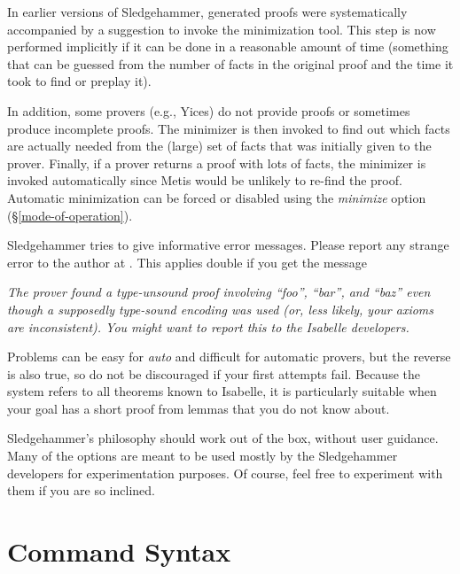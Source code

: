\documentclass[a4paper,12pt]{article}
\begin{document}
In earlier versions of Sledgehammer, generated proofs were systematically
accompanied by a suggestion to invoke the minimization tool. This step is now
performed implicitly if it can be done in a reasonable amount of time (something
that can be guessed from the number of facts in the original proof and the time
it took to find or preplay it).

In addition, some provers (e.g., Yices) do not provide proofs or sometimes
produce incomplete proofs. The minimizer is then invoked to find out which facts
are actually needed from the (large) set of facts that was initially given to
the prover. Finally, if a prover returns a proof with lots of facts, the
minimizer is invoked automatically since Metis would be unlikely to re-find the
proof.
%
Automatic minimization can be forced or disabled using the \textit{minimize}
option (\S\ref{mode-of-operation}).


Sledgehammer tries to give informative error messages. Please report any strange
error to the author at \authoremail. This applies double if you get the message

\prew
\slshape
The prover found a type-unsound proof involving ``\textit{foo\/}'',
``\textit{bar\/}'', and ``\textit{baz\/}'' even though a supposedly type-sound
encoding was used (or, less likely, your axioms are inconsistent). You might
want to report this to the Isabelle developers.
\postw


Problems can be easy for \textit{auto} and difficult for automatic provers, but
the reverse is also true, so do not be discouraged if your first attempts fail.
Because the system refers to all theorems known to Isabelle, it is particularly
suitable when your goal has a short proof from lemmas that you do not know
about.


Sledgehammer's philosophy should work out of the box, without user guidance.
Many of the options are meant to be used mostly by the Sledgehammer developers
for experimentation purposes. Of course, feel free to experiment with them if
you are so inclined.

\section{Command Syntax}
\label{command-syntax}
\end{document}

